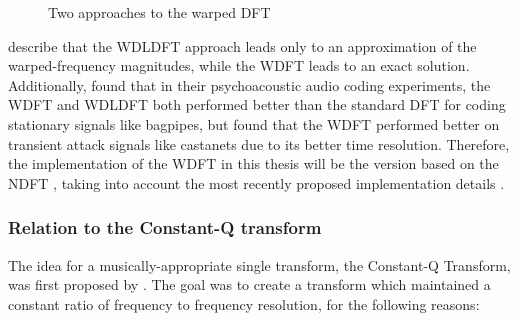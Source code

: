 \documentclass[letter,12pt,notitlepage]{article}
\begin{document}
\begin{figure}[ht]
	\centering
	\caption{Two approaches to the warped DFT}
	\label{fig:wdfts}
\end{figure}

\citet{warped1} describe that the WDLDFT approach leads only to an approximation of the warped-frequency magnitudes, while the WDFT leads to an exact solution. Additionally, \citet{warpedcomparison} found that in their psychoacoustic audio coding experiments, the WDFT and WDLDFT both performed better than the standard DFT for coding stationary signals like bagpipes, but found that the WDFT performed better on transient attack signals like castanets due to its better time resolution. Therefore, the implementation of the WDFT in this thesis will be the version based on the NDFT \cite{warped1}, taking into account the most recently proposed implementation details \cite{warped2}.

\subsubsection{Relation to the Constant-Q transform}

The idea for a musically-appropriate single transform, the Constant-Q Transform, was first proposed by \citet{jbrown}. The goal was to create a transform which maintained a constant ratio of frequency to frequency resolution, for the following reasons:
\end{document}
